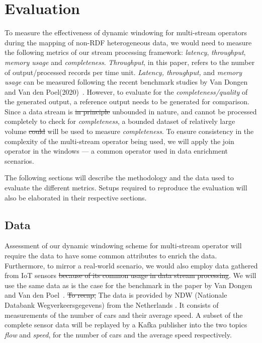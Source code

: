 \chapter{Evaluation}

To measure the effectiveness of dynamic windowing for multi-stream operators during the 
mapping of non-RDF heterogeneous data, we would need to measure the following 
metrics of our stream processing framework: \emph{latency}, \emph{throughput},
\emph{memory usage} and \emph{completeness}. \emph{Throughput}, in this 
paper, refers to the number of output/processed records per time unit.
\emph{Latency, throughput,} and \emph{memory usage} can be measured following the recent benchmark studies by 
Van Dongen and Van den Poel(2020)~\cite{evalution_of_spe}.
However, to evaluate 
for the \emph{completeness/quality}
of the generated output, a reference output needs 
to be generated for comparison. Since a data stream is \sout{in principle} unbounded in nature, 
and cannot be processed completely to check for \emph{completeness}, a bounded 
dataset of relatively large volume \sout{could} will be used to measure \emph{completeness}.
To ensure consistency in the complexity of the multi-stream operator being used, 
we will apply the join operator in the windows --- a common operator used in 
data enrichment scenarios. 


The following sections will describe the methodology and the data used to evaluate the
different metrics. Setups required to reproduce the evaluation will also be elaborated 
in their respective sections. 


\section{Data}

Assessment of our dynamic windowing scheme for multi-stream operator will require 
the data to have some common attributes to enrich the data. Furthermore, to 
mirror a real-world scenario, we would also employ data gathered from IoT sensors
\sout{because of its common usage in data stream processing}.
We will use the same data 
as is the case for the benchmark in the paper by Van Dongen and Van den Poel~\cite{evalution_of_spe}. 
\sout{To recap,} The data is provided by NDW (Nationale Databank Wegverkeersgegevens) from the 
Netherlands . It consists of measurements of the number of cars and their average speed. 
A subset of the complete sensor data will be replayed by a Kafka publisher into the two topics 
\emph{flow} and \emph{speed}, for the number of cars and the average speed respectively. 

